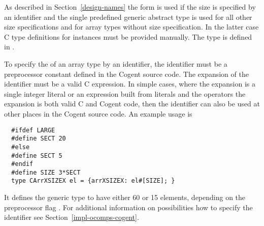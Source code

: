 As described in Section~\ref{design-names} the form 
is used if the size is specified by an identifier and the single predefined generic abstract type  is used for all other
size specifications and for array types without size specification. In the latter case C type definitions for instances must be provided 
manually. The type  is defined in .

To specify the  of an array type by an identifier, the identifier must be a preprocessor constant
defined in the Cogent source code. The expansion of the identifier must be a valid C expression. In simple cases,
where the expansion is a single integer literal or an expression built from literals and the operators \code{+ - * /}
the expansion is both valid C and Cogent code, then the identifier can also be used at other places in the Cogent
source code. An example usage is
\begin{verbatim}
  #ifdef LARGE
  #define SECT 20
  #else 
  #define SECT 5
  #endif
  #define SIZE 3*SECT
  type CArrXSIZEX el = {arrXSIZEX: el#[SIZE]; }
\end{verbatim}
It defines the generic type  to have either 60 or 15 elements, depending on the preprocessor flag .
For additional information on possibilities how to specify the identifier see Section~\ref{impl-ocomps-cogent}.


